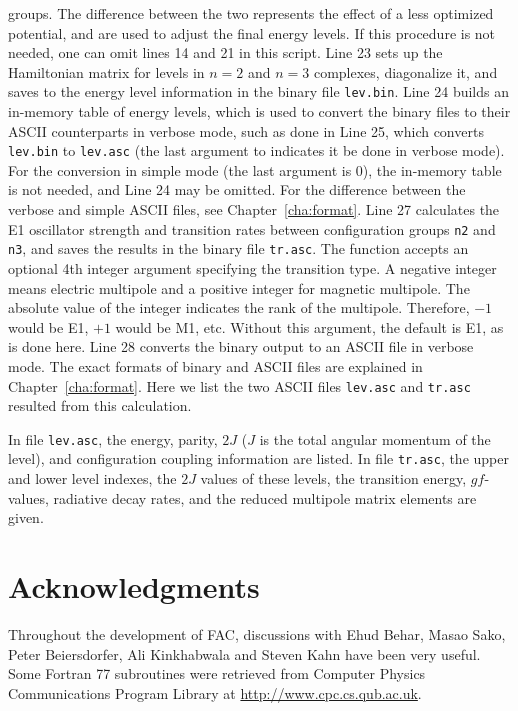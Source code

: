 groups. The difference between the two represents the effect of a less optimized
potential, and are used to adjust the final energy levels. If this procedure is
not needed, one can omit lines 14 and 21 in this script. Line 23 sets up the
Hamiltonian matrix for levels in $n = 2$ and $n = 3$ complexes, diagonalize it,
and saves to the energy level information in the binary file \verb|lev.bin|.
Line 24 builds an in-memory table of energy levels, which is used to convert the
binary files to their ASCII counterparts in verbose mode, such as done in Line
25, which converts \verb|lev.bin| to \verb|lev.asc| (the last argument to
 indicates it be done in verbose mode). For the conversion
in simple mode (the last argument is 0), the in-memory table is not needed, and
Line 24 may be omitted. For the difference between the verbose and simple ASCII
files, see Chapter~\ref{cha:format}. Line 27 calculates the E1 oscillator
strength and transition rates between configuration groups \verb|n2| and
\verb|n3|, and saves the results in the binary file \verb|tr.asc|. The function
 accepts an optional 4th integer argument specifying
the transition type. A negative integer means electric multipole and a positive
integer for magnetic multipole. The absolute value of the integer indicates the
rank of the multipole. Therefore, $-1$ would be E1, $+1$ would be M1, etc.
Without this argument, the default is E1, as is done here. Line 28 converts the
binary output to an ASCII file in verbose mode. The exact formats of binary and
ASCII files are explained in Chapter~\ref{cha:format}. Here we list the two
ASCII files \verb|lev.asc| and \verb|tr.asc| resulted from this calculation.

\lstset{numbers=none,basicstyle=\scriptsize,caption=demo/structure/lev.asc}

\lstset{numbers=none,basicstyle=\scriptsize,caption=demo/structure/tr.asc}

In file \verb|lev.asc|, the energy, parity, $2J$ ($J$ is the total
angular momentum of the level), and configuration coupling information are
listed. In file \verb|tr.asc|, the upper and lower level indexes, the $2J$
values of these levels, the transition energy, $gf$-values, radiative
decay rates, and the reduced multipole matrix elements are given.

\section{Acknowledgments}
Throughout the development of FAC, discussions with Ehud Behar, Masao
Sako, Peter Beiersdorfer, Ali Kinkhabwala and Steven Kahn have been very
useful. Some Fortran 77 subroutines were retrieved from Computer Physics
Communications Program Library at \url{http://www.cpc.cs.qub.ac.uk}.

